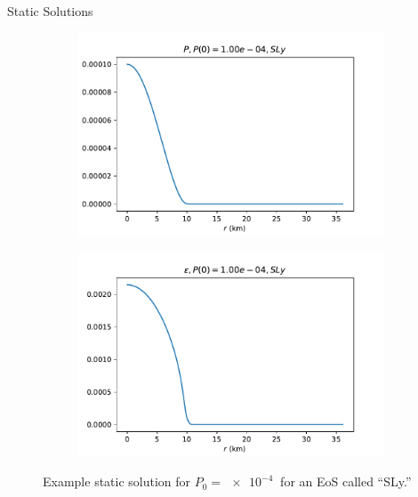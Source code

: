 \documentclass[]{beamer}
\begin{document}
\begin{frame}{Static Solutions}
        \begin{figure}[h!]
            \centering
            \begin{subfigure}{.5\textwidth}
                \includegraphics[width = \textwidth]{../paper/images/tov/SLy_P,p00.0001.pdf}
            \end{subfigure}%
            \begin{subfigure}{.5\textwidth}
                \includegraphics[width = \textwidth]{../paper/images/tov/SLy_rho,p00.0001.pdf}
            \end{subfigure}
            \caption[]{Example static solution for $P_0 = \SI{e-4}{}$ for an EoS called ``SLy.''}
        \end{figure}
    \end{frame}
\end{document}
